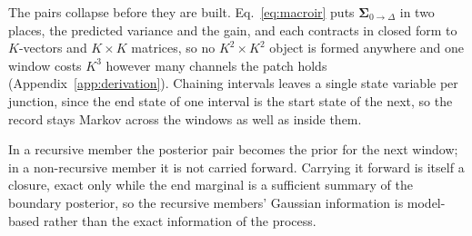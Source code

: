 The pairs collapse before they are built. Eq.~\ref{eq:macroir} puts
$\bm{\Sigma}_{0\to\Delta}$ in two places, the predicted variance and the gain, and each contracts
in closed form to $K$-vectors and $K\times K$ matrices, so no $K^2\times K^2$ object is formed
anywhere and one window costs $K^3$ however many channels the patch holds
(Appendix~\ref{app:derivation}). Chaining intervals leaves a single state variable per junction,
since the end state of one interval is the start state of the next, so the record stays Markov
across the windows as well as inside them.

In a recursive member the posterior pair becomes the prior for the next window; in a non-recursive
member it is not carried forward. Carrying it forward is itself a closure, exact only while the end
marginal is a sufficient summary of the boundary posterior, so the recursive members' Gaussian
information is model-based rather than the exact information of the process.

